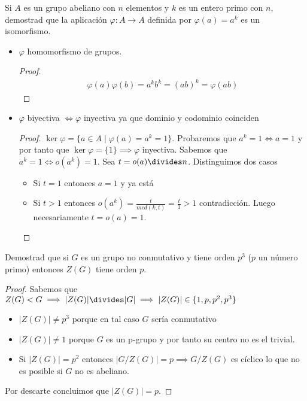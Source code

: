 \documentclass{book}
\theoremstyle{definition}
\theoremstyle{remark}
\begin{document}
\begin{ex}[H2.13] Si $A$ es un grupo abeliano con $n$ elementos y $k$ es un entero primo con $n$, demostrad que la aplicación $\varphi : A \to A$ definida por $\varphi(a) = a^k$ es un isomorfismo.
	\begin{itemize}
		\item $\varphi$ homomorfismo de grupos.
		\begin{proof}
			\begin{align*}
				\varphi(a)\varphi(b) = a^kb^k = (ab)^k = \varphi(ab)
			\end{align*}
		\end{proof}
		\item $\varphi$ biyectiva $\iff \varphi$ inyectiva ya que dominio y codominio coinciden
		\begin{proof}
			$\ker \varphi = \{a \in A \mid \varphi(a) = a^k = 1\}$. Probaremos que $a^k = 1 \iff a = 1$ y por tanto que $\ker \varphi = \{1\} \implies \varphi$ inyectiva. Sabemos que $a^k = 1 \iff o(a^k) = 1$. Sea $t = o(a) \divides n$. Distinguimos dos casos
			\begin{itemize}
				\item Si $t = 1$ entonces $a = 1$ y ya está
				\item Si $t > 1$ entonces $o(a^k) = \frac{t}{mcd(k, t)} = \frac{t}{1} > 1$ contradicción. Luego necesariamente $t = o(a) = 1$.
			\end{itemize}
		\end{proof}
	\end{itemize}
\end{ex}

\begin{ex}[H2.22]
	Demostrad que si $G$ es un grupo no conmutativo y tiene orden $p^3$ ($p$ un número primo) entonces $Z(G)$ tiene orden $p$.
	
	\begin{proof}
		Sabemos que $Z(G) < G \implies |Z(G)| \divides |G| \implies |Z(G)| \in \{1, p, p^2, p^3\}$
		\begin{itemize}
			\item $|Z(G)| \neq p^3$ porque en tal caso $G$ sería conmutativo
			\item $|Z(G)| \neq 1$ porque $G$ es un p-grupo y por tanto su centro no es el trivial.
			\item Si $|Z(G)| = p^2$ entonces $|G/Z(G)| = p \implies G/Z(G)$ es cíclico lo que no es posible si $G$ no es abeliano.
		\end{itemize}
	
		Por descarte concluimos que $|Z(G)| = p$.
	\end{proof}
\end{ex}
\end{document}
